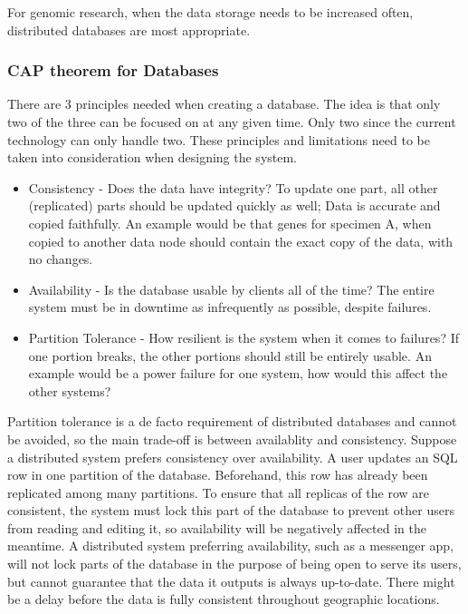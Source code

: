 \documentclass[acmsmall]{acmart}
\begin{document}
For genomic research, when the data storage needs to be increased often, distributed databases are most appropriate.

\subsubsection{CAP theorem for Databases} \label{cap}
There are 3 principles needed when creating a database. The idea is that only two of the three can be focused on at any given time. Only two since the current technology can only handle two. These principles and limitations need to be taken into consideration when designing the system. 

\begin{itemize}
    \item Consistency - Does the data have integrity? To update one part, all other (replicated) parts should be updated quickly as well; Data is accurate and copied faithfully. An example would be that genes for specimen A, when copied to another data node should contain the exact copy of the data, with no changes.
    \item Availability - Is the database usable by clients all of the time? The entire system must be in downtime as infrequently as possible, despite failures.
    \item Partition Tolerance - How resilient is the system when it comes to failures? If one portion breaks, the other portions should still be entirely usable. An example would be a power failure for one system, how would this affect the other systems?
\end{itemize}

Partition tolerance is a de facto requirement of distributed databases and cannot be avoided, so the main trade-off is between availablity and consistency. \cite{Silberschatz2010} Suppose a distributed system prefers consistency over availability. A user updates an SQL row in one partition of the database. Beforehand, this row has already been replicated among many partitions. To ensure that all replicas of the row are consistent, the system must lock this part of the database to prevent other users from reading and editing it, so availability will be negatively affected in the meantime. A distributed system preferring availability, such as a messenger app, will not lock parts of the database in the purpose of being open to serve its users, but cannot guarantee that the data it outputs is always up-to-date. There might be a delay before the data is fully consistent throughout geographic locations.
\end{document}
